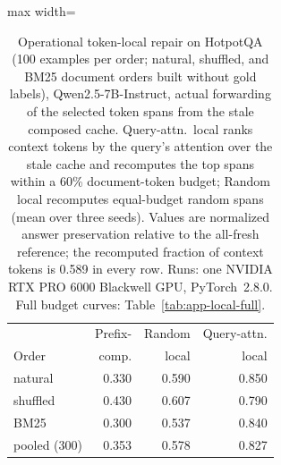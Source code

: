 \begin{table}[t]
\centering
\footnotesize
\setlength{\tabcolsep}{4pt}
\begin{adjustbox}{max width=\linewidth}
\begin{tabular}{lrrr}
\toprule
 & Prefix- & Random & Query-attn. \\
Order & comp. & local & local \\
\midrule
natural & 0.330 & 0.590 & 0.850 \\
shuffled & 0.430 & 0.607 & 0.790 \\
BM25 & 0.300 & 0.537 & 0.840 \\
\midrule
pooled (300) & 0.353 & 0.578 & 0.827 \\
\bottomrule
\end{tabular}
\end{adjustbox}
\caption{Operational token-local repair on HotpotQA (100 examples per order; natural, shuffled, and BM25 document orders built without gold labels), Qwen2.5-7B-Instruct, actual forwarding of the selected token spans from the stale composed cache. Query-attn.\ local ranks context tokens by the query's attention over the stale cache and recomputes the top spans within a 60\% document-token budget; Random local recomputes equal-budget random spans (mean over three seeds). Values are normalized answer preservation relative to the all-fresh reference; the recomputed fraction of context tokens is 0.589 in every row. Runs: one NVIDIA RTX PRO 6000 Blackwell GPU, PyTorch~2.8.0. Full budget curves: Table~\ref{tab:app-local-full}.}
\label{tab:local-operational}
\end{table}
